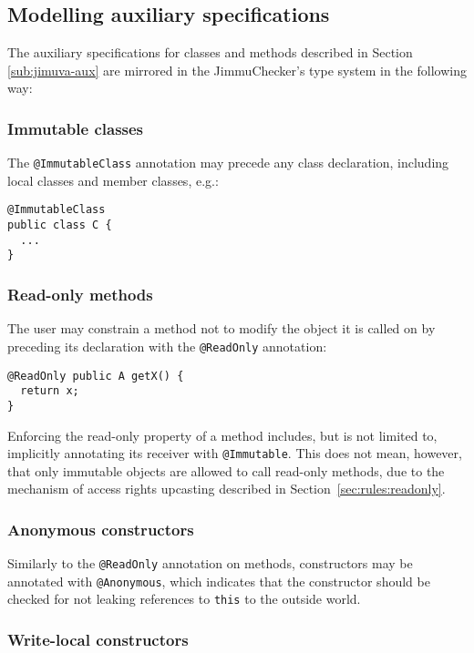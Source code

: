 \documentclass{pracamgr}
\theoremstyle{break}
\theoremstyle{break}
\theoremstyle{break}
\begin{document}
\subsection{Modelling auxiliary specifications}

The auxiliary specifications for classes and methods described in
Section \ref{sub:jimuva-aux} are mirrored in the JimmuChecker's type
system in the following way: 

\subsubsection{Immutable classes}

The \texttt{@ImmutableClass} annotation may precede any class
declaration, including local classes and member classes, e.g.:

\begin{lstlisting}
@ImmutableClass
public class C {
  ...
}
\end{lstlisting}

\subsubsection{Read-only methods}

The user may constrain a method not to modify the object it is called
on by preceding its declaration with the \texttt{@ReadOnly} annotation:

\begin{lstlisting}
@ReadOnly public A getX() { 
  return x; 
}
\end{lstlisting}
Enforcing the read-only property of a method includes, but is not
limited to, implicitly annotating its receiver with
\texttt{@Immutable}. This does not mean, however, that only immutable
objects are allowed to call read-only methods, due to the mechanism of
access rights upcasting described in Section~\ref{sec:rules:readonly}.

\subsubsection{Anonymous constructors}

Similarly to the \texttt{@ReadOnly} annotation on methods,
constructors may be annotated with \texttt{@Anonymous}, which
indicates that the constructor should be checked for not leaking
references to \texttt{this} to the outside world.

\subsubsection{Write-local constructors}
\label{sub:mirroring-writelocal}
\end{document}
